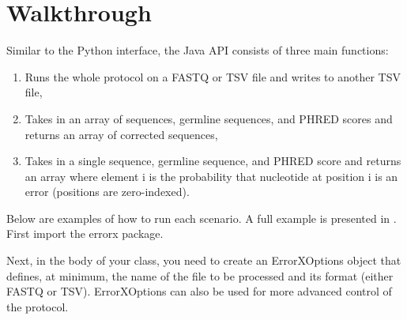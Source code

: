 \documentclass[letterpaper,10pt,english]{sphinxmanual}
\begin{document}
\section{Walkthrough}
\label{\detokenize{index:id4}}
Similar to the Python interface, the Java API consists of three main functions:
\begin{enumerate}
\def\theenumi{\arabic{enumi}}
\def\labelenumi{\theenumi .}
\makeatletter\def\p@enumii{\p@enumi \theenumi .}\makeatother
\item {} 
Runs the whole protocol on a FASTQ or TSV file and writes to another TSV file,

\item {} 
Takes in an array of sequences, germline sequences, and PHRED scores and returns an array of corrected sequences,

\item {} 
Takes in a single sequence, germline sequence, and PHRED score and returns an array where element i is the probability that nucleotide at position i is an error (positions are zero-indexed).

\end{enumerate}

Below are examples of how to run each scenario. A full example is presented in . First import the errorx package.

\begin{sphinxVerbatim}[commandchars=\\\{\}]
 
\end{sphinxVerbatim}

Next, in the body of your class, you need to create an ErrorXOptions object that defines, at minimum, the name of the file to be processed and its format (either FASTQ or TSV). ErrorXOptions can also be used for more advanced control of the protocol.

\begin{sphinxVerbatim}[commandchars=\\\{\}]
       
  
  
	
    
  
\end{sphinxVerbatim}
\end{document}
